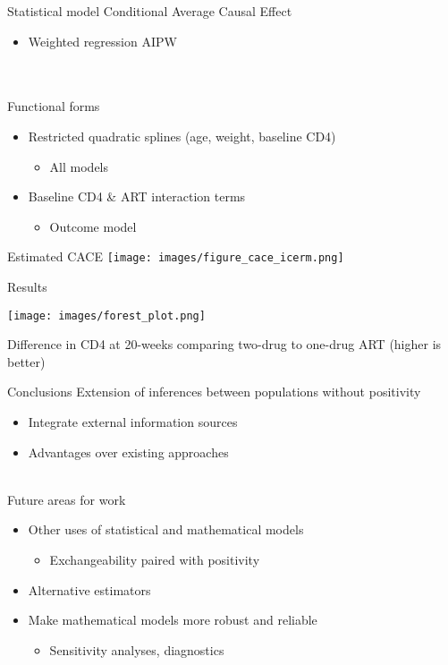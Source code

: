 \documentclass{beamer}
\begin{document}
\begin{frame}{Statistical model}
	Conditional Average Causal Effect
	\begin{itemize}
		\item Weighted regression AIPW
	\end{itemize}
	~\\~\\
	Functional forms
	\begin{itemize}
		\item Restricted quadratic splines (age, weight, baseline CD4)
		\begin{itemize}
			\item All models
		\end{itemize}
		\item Baseline CD4 \& ART interaction terms
		\begin{itemize}
			\item Outcome model
		\end{itemize}
	\end{itemize}
\end{frame}

\begin{frame}{Estimated CACE}
	\centering
	\texttt{[image: images/figure\_cace\_icerm.png]}
\end{frame}

\begin{frame}{Results}
	\begin{center}
		\texttt{[image: images/forest\_plot.png]}
	\end{center}
	\small 
	Difference in CD4 at 20-weeks comparing two-drug to one-drug ART (higher is better)
\end{frame}

\begin{frame}{Conclusions}
	Extension of inferences between populations without positivity
	\begin{itemize}
		\item Integrate external information sources
		\item Advantages over existing approaches
	\end{itemize}
	~\\
	Future areas for work
	\begin{itemize}
		\item Other uses of statistical and mathematical models
		\begin{itemize}
			\item Exchangeability paired with positivity
		\end{itemize}
		\item Alternative estimators
		\item Make mathematical models more robust and reliable
		\begin{itemize}
			\item Sensitivity analyses, diagnostics
		\end{itemize}
	\end{itemize}
\end{frame}
\end{document}
